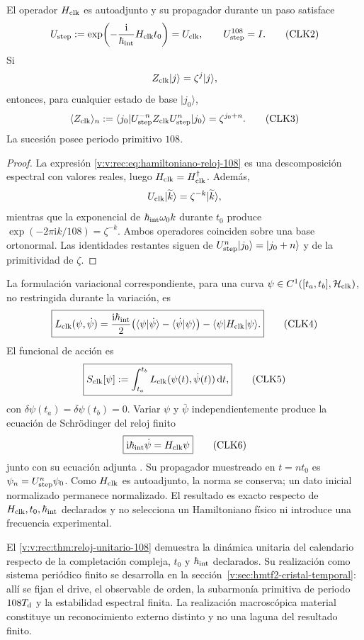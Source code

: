 \begin{theorem}
\label{v:v:rec:thm:reloj-unitario-108}
El operador \(H_{\rm clk}\) es autoadjunto y su propagador durante un paso
satisface
\[
 U_{\rm step}
 :=\exp\!\left(-\frac{\mathrm i}{\hbar_{\rm int}}
 H_{\rm clk}t_0\right)
 =U_{\rm clk},
 \qquad
 U_{\rm step}^{108}=I.
 \tag{CLK2}\label{v:v:rec:eq:propagador-reloj-108}
\]
Si
\[
 Z_{\rm clk}|j\rangle=\zeta^j|j\rangle,
\]
entonces, para cualquier estado de base \(|j_0\rangle\),
\[
 \langle Z_{\rm clk}\rangle_{n}
 :=\langle j_0|U_{\rm step}^{-n}Z_{\rm clk}
 U_{\rm step}^n|j_0\rangle
 =\zeta^{j_0+n}.
 \tag{CLK3}\label{v:v:rec:eq:respuesta-reloj-108}
\]
La sucesión posee periodo primitivo \(108\).
\end{theorem}

\begin{proof}
La expresión \eqref{v:v:rec:eq:hamiltoniano-reloj-108} es una descomposición
espectral con valores reales, luego \(H_{\rm clk}=H_{\rm clk}^\dagger\).
Además,
\[
 U_{\rm clk}|\widetilde k\rangle
 =\zeta^{-k}|\widetilde k\rangle,
\]
mientras que la exponencial de
\(\hbar_{\rm int}\omega_0 k\) durante \(t_0\) produce
\(\exp(-2\pi\mathrm ik/108)=\zeta^{-k}\). Ambos operadores coinciden sobre
una base ortonormal. Las identidades restantes siguen de
\(U_{\rm step}^n|j_0\rangle=|j_0+n\rangle\) y de la primitividad de
\(\zeta\).
\end{proof}

La formulación variacional correspondiente, para una curva
\(\psi\in C^1([t_a,t_b],\mathcal H_{\rm clk})\), no restringida durante la
variación, es
\[
 \boxed{
 L_{\rm clk}(\psi,\dot\psi)
 =\frac{\mathrm i\hbar_{\rm int}}2
 \bigl(
 \langle\psi|\dot\psi\rangle
 -\langle\dot\psi|\psi\rangle
 \bigr)
 -\langle\psi|H_{\rm clk}|\psi\rangle.}
 \tag{CLK4}\label{v:v:rec:eq:lagrangiano-reloj-108}
\]
El funcional de acción es
\[
 \boxed{
 S_{\rm clk}[\psi]
 :=\int_{t_a}^{t_b}
 L_{\rm clk}(\psi(t),\dot\psi(t))\,\mathrm dt,}
 \tag{CLK5}\label{v:v:rec:eq:accion-reloj-108}
\]
con \(\delta\psi(t_a)=\delta\psi(t_b)=0\).
Variar \(\psi\) y \(\bar\psi\) independientemente produce la ecuación de
Schrödinger del reloj finito
\[
 \boxed{\mathrm i\hbar_{\rm int}\dot\psi=H_{\rm clk}\psi}
 \tag{CLK6}\label{v:v:rec:eq:schrodinger-reloj-108}
\]
junto con su ecuación adjunta \cite{v:SchrodingerNobel}. Su propagador muestreado
en \(t=nt_0\) es \(\psi_n=U_{\rm step}^{n}\psi_0\). Como \(H_{\rm clk}\) es
autoadjunto, la norma se conserva; un dato inicial normalizado permanece
normalizado. El resultado es exacto respecto de
\(H_{\rm clk},t_0,\hbar_{\rm int}\) declarados y no selecciona un Hamiltoniano
físico ni introduce una frecuencia experimental.

El \cref{v:v:rec:thm:reloj-unitario-108} demuestra la dinámica unitaria del calendario
respecto de la completación compleja, \(t_0\) y \(\hbar_{\rm int}\)
declarados. Su realización como sistema periódico finito se desarrolla
en la sección~\ref{v:sec:hmtf2-cristal-temporal}: allí se
fijan el drive, el observable de orden, la subarmonía primitiva de periodo
\(108T_{\rm d}\) y la estabilidad espectral finita. La realización
macroscópica material constituye un reconocimiento externo distinto y no una
laguna del resultado finito.
